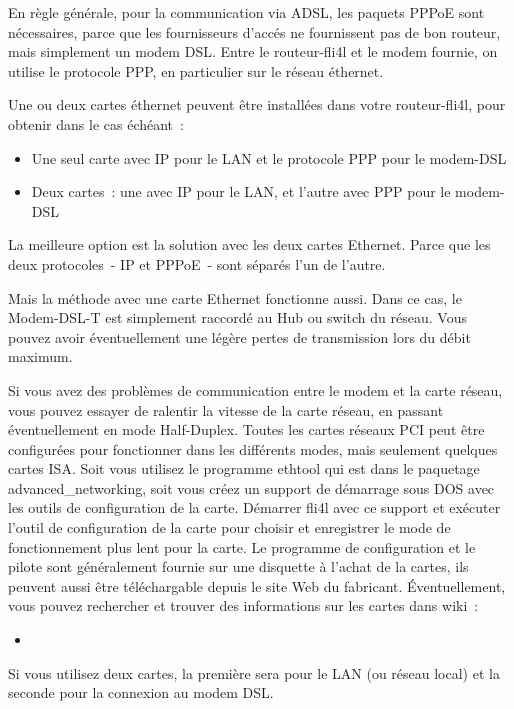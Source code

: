 En règle générale, pour la communication via ADSL, les paquets PPPoE sont
nécessaires, parce que les fournisseurs d'accés ne fournissent pas de bon
routeur, mais simplement un modem DSL. Entre le routeur-fli4l et le modem
fournie, on utilise le protocole PPP, en particulier sur le réseau éthernet.

Une ou deux cartes éthernet peuvent être installées dans votre routeur-fli4l,
pour obtenir dans le cas échéant~:
\begin{itemize}
\item Une seul carte avec IP pour le LAN et le protocole PPP pour le modem-DSL
\item Deux cartes~: une avec IP pour le LAN, et l'autre avec PPP pour le modem-DSL
\end{itemize}

La meilleure option est la solution avec les deux cartes Ethernet. Parce que
les deux protocoles~- IP et PPPoE~- sont séparés l'un de l'autre.

Mais la méthode avec une carte Ethernet fonctionne aussi. Dans ce cas, le
Modem-DSL-T est simplement raccordé au Hub ou switch du réseau. Vous pouvez
avoir éventuellement une légère pertes de transmission lors du débit maximum.

Si vous avez des problèmes de communication entre le modem et la carte réseau,
vous pouvez essayer de ralentir la vitesse de la carte réseau, en passant
éventuellement en mode Half-Duplex. Toutes les cartes réseaux PCI peut être
configurées pour fonctionner dans les différents modes, mais seulement quelques
cartes ISA. Soit vous utilisez le programme ethtool qui est dans le paquetage
advanced\_networking, soit vous créez un support de démarrage sous DOS avec les
outils de configuration de la carte. Démarrer fli4l avec ce support et exécuter
l'outil de configuration de la carte pour choisir et enregistrer le mode de
fonctionnement plus lent pour la carte. Le programme de configuration et le pilote
sont généralement fournie sur une disquette à l'achat de la cartes, ils peuvent
aussi être téléchargable depuis le site Web du fabricant. Éventuellement, vous
pouvez rechercher et trouver des informations sur les cartes dans wiki~:
\begin{itemize}
\item {}
\end{itemize}

Si vous utilisez deux cartes, la première sera pour le LAN (ou réseau local) et
la seconde pour la connexion au modem DSL.

